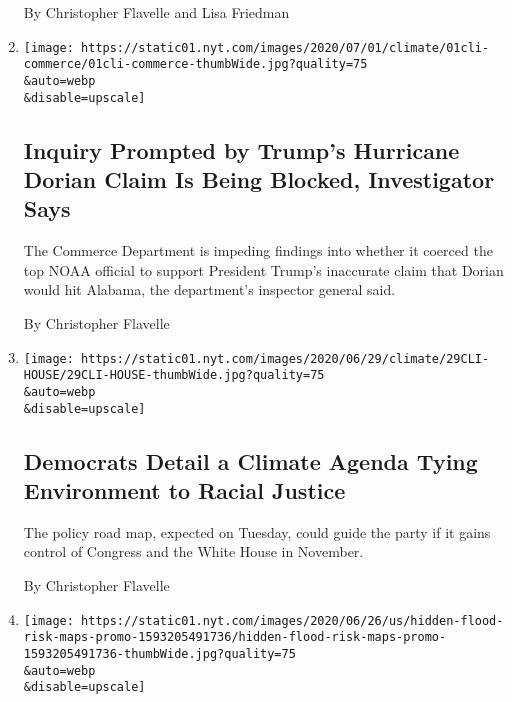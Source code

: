 \begin{enumerate}
  By Christopher Flavelle and Lisa Friedman
\item
  \href{/2020/07/01/climate/trump-dorian-noaa-investigation.html}{}

  \texttt{[image: https://static01.nyt.com/images/2020/07/01/climate/01cli-commerce/01cli-commerce-thumbWide.jpg?quality=75\\\&auto=webp\\\&disable=upscale]}

  \hypertarget{inquiry-prompted-by-trumps-hurricane-dorian-claim-is-being-blocked-investigator-says}{%
  \subsection{Inquiry Prompted by Trump's Hurricane Dorian Claim Is
  Being Blocked, Investigator
  Says}\label{inquiry-prompted-by-trumps-hurricane-dorian-claim-is-being-blocked-investigator-says}}

  The Commerce Department is impeding findings into whether it coerced
  the top NOAA official to support President Trump's inaccurate claim
  that Dorian would hit Alabama, the department's inspector general
  said.

  By Christopher Flavelle
\item
  \href{/2020/06/29/climate/house-democrats-climate-plan.html}{}

  \texttt{[image: https://static01.nyt.com/images/2020/06/29/climate/29CLI-HOUSE/29CLI-HOUSE-thumbWide.jpg?quality=75\\\&auto=webp\\\&disable=upscale]}

  \hypertarget{democrats-detail-a-climate-agenda-tying-environment-to-racial-justice}{%
  \subsection{Democrats Detail a Climate Agenda Tying Environment to
  Racial
  Justice}\label{democrats-detail-a-climate-agenda-tying-environment-to-racial-justice}}

  The policy road map, expected on Tuesday, could guide the party if it
  gains control of Congress and the White House in November.

  By Christopher Flavelle
\item
  \href{/interactive/2020/06/29/climate/hidden-flood-risk-maps.html}{}

  \texttt{[image: https://static01.nyt.com/images/2020/06/26/us/hidden-flood-risk-maps-promo-1593205491736/hidden-flood-risk-maps-promo-1593205491736-thumbWide.jpg?quality=75\\\&auto=webp\\\&disable=upscale]}

  \hypertarget{new-data-reveals-hidden-flood-risk-across-america}{%
}
\end{enumerate}
